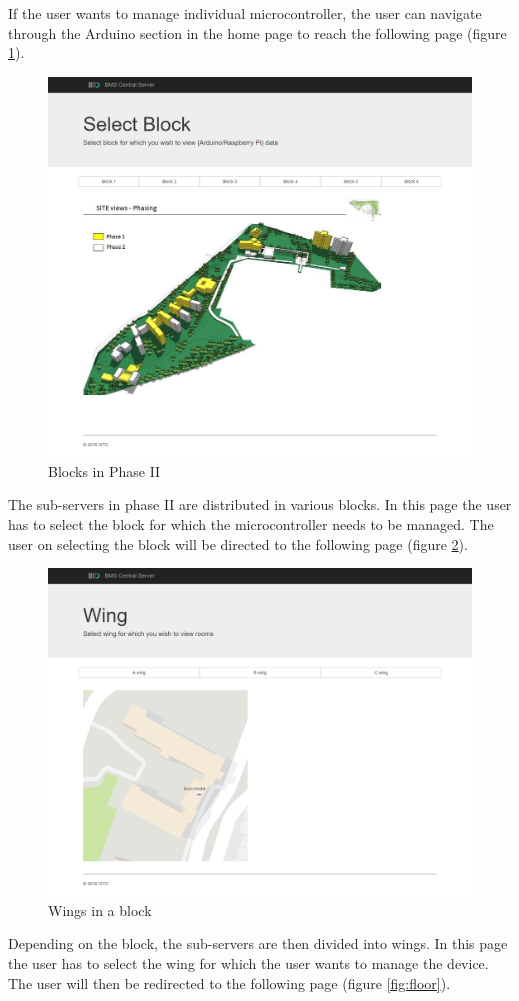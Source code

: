 \documentclass[letterpaper,11pt]{report}
\begin{document}
\newpage
If the user wants to manage individual microcontroller, the user can navigate through the Arduino section in the home page to reach the following page (figure \ref{fig:block}).
\begin{figure}[h]
\includegraphics[width=\textwidth]{block}
\centering
\captionsetup{justification=centering}
\caption{Blocks in Phase II}
\label{fig:block}
\end{figure}
\par
The sub-servers in phase II are distributed in various blocks. In this page the user has to select the block for which the microcontroller needs to be managed. The user on selecting the block will be directed to the following page (figure \ref{fig:wing}).

\newpage
\begin{figure}[h]
\includegraphics[width=\textwidth]{wing}
\centering
\captionsetup{justification=centering}
\caption{Wings in a block}
\label{fig:wing}
\end{figure}
Depending on the block, the sub-servers are then divided into wings. In this page the user has to select the wing for which the user wants to manage the device. The user will then be redirected to the following page (figure \ref{fig:floor}).
\end{document}
